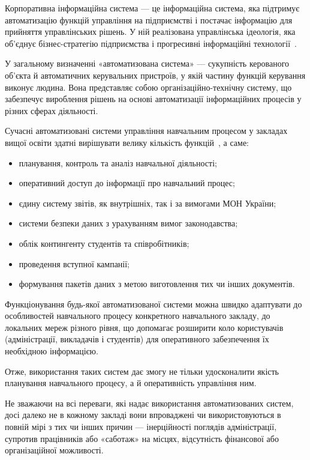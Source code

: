 \label{subsubs:KIS}

Корпоративна інформаційна система — це інформаційна система, яка підтримує автоматизацію функцій управління на підприємстві і постачає інформацію для прийняття управлінських рішень. У ній реалізована управлінська ідеологія, яка об'єднує бізнес-стратегію підприємства і прогресивні інформаційні технології~\cite{hansvanderhoeven2011}.

У загальному визначенні «автоматизована система» — сукупність керованого об'єкта й автоматичних керувальних пристроїв, у якій частину функцій керування виконує людина. Вона представляє собою організаційно-технічну систему, що забезпечує вироблення рішень на основі автоматизації інформаційних процесів у різних сферах діяльності. 

Сучасні автоматизовані системи управління навчальним процесом у  закладах вищої освіти здатні вирішувати велику кількість функцій~\cite{співаковський2014побудова}, а саме:
\begin{itemize}
	\item планування, контроль та аналіз навчальної діяльності;
	\item оперативний доступ до інформації про навчальний процес;
	\item єдину систему звітів, як внутрішніх, так і за вимогами МОН України;
	\item системи безпеки даних з урахуванням вимог законодавства;
	\item облік контингенту студентів та співробітників;
	\item проведення вступної кампанії;
	\item формування пакетів даних з метою виготовлення тих чи інших документів.
\end{itemize}

Функціонування будь-якої автоматизованої системи можна швидко адаптувати до особливостей навчального процесу конкретного навчального закладу, до локальних мереж різного рівня, що допомагає розширити коло користувачів (адміністрації, викладачів і студентів) для оперативного забезпечення їх необхідною інформацією. 

Отже, використання таких систем дає змогу не тільки удосконалити якість планування навчального процесу, а й оперативність управління ним.

Не зважаючи на всі переваги, які надає використання автоматизованих систем, досі далеко не в кожному закладі вони впроваджені чи використовуються в повній мірі з тих чи інших причин — інерційності поглядів адміністрації, супротив працівників або «саботаж» на місцях, відсутність фінансової або організаційної можливості.

